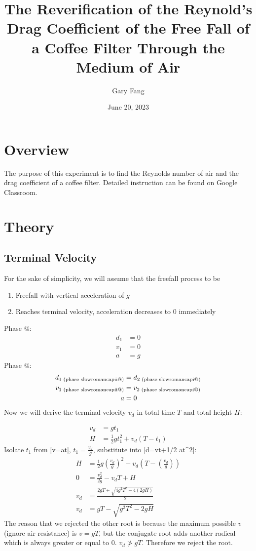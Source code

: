 \documentclass{article}
\title{The Reverification of the Reynold's Drag Coefficient of the Free Fall of a Coffee Filter Through the Medium of Air}
\author{Gary Fang}
\date{June 20, 2023}
\makeatletter
\newcommand*{\rom}[1]{\expandafter\@slowromancap\romannumeral #1@}
\makeatother
\begin{document}
\maketitle
\tableofcontents
\newpage

\section{Overview}
\setcounter{page}{1}
The purpose of this experiment is to find the Reynolds number of air and the drag coefficient of a coffee filter. Detailed instruction can be found on Google Classroom.

\section{Theory}
\label{theory}
\subsection{Terminal Velocity}
For the sake of simplicity, we will assume that the freefall process to be
\begin{enumerate}
    \item Freefall with vertical acceleration of $g$
    \item Reaches terminal velocity, acceleration decreases to 0 immediately
\end{enumerate}
Phase \rom{1}:
\begin{align*}
    d_1&=0\\
    v_1&=0\\
    a&=g
\end{align*}
Phase \rom{2}:
\begin{align*}
    d_{1\text{ (phase \rom{2})}}&=d_{2\text{ (phase \rom{1})}}\\
    v_{1\text{ (phase \rom{2})}}&=v_{2\text{ (phase \rom{1})}}\\
    a&=0
\end{align*}
Now we will derive the terminal velocity $v_d$ in total time $T$ and total height $H$:

\begin{align*}
v_d&=gt_1\label{v=at}\tag{1} \\
H&=\frac 12gt_1^2+v_d\left(T-t_1\right)\label{d=vt+1/2 at^2}\tag{2}
\end{align*}
Isolate $t_1$ from \eqref{v=at}, $t_1=\frac{v_d}{g}$, substitute into \eqref{d=vt+1/2 at^2}:
\begin{align*}
    H&=\frac 12g\left(\frac{v_d}{g}\right)^2+v_d\left(T-\left(\frac{v_d}{g}\right)\right)\\
    0&=\frac{v_d^2}{2g}-v_dT+H\\
    v_d&=\frac{2gT\pm\sqrt{4g^2T^2-4\left(2gH\right)}}{2}\\
    v_d&=gT-\sqrt{g^2T^2-2gH}\label{vd:TH}\tag{3}
\end{align*}
The reason that we rejected the other root is because the maximum possible $v$ (ignore air resistance) is $v=gT$, but the conjugate root adds another radical which is always greater or equal to $0$. $v_d\not>gT$. Therefore we reject the root.
\end{document}
